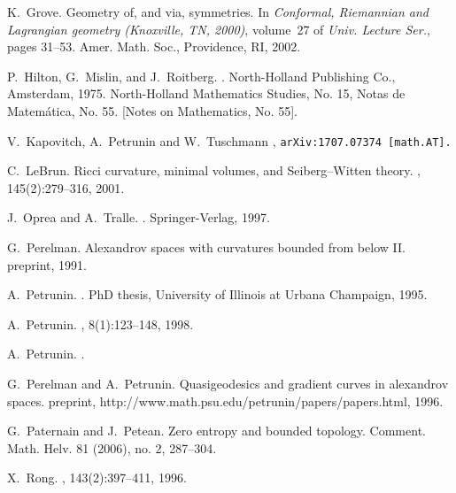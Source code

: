 \documentclass{amsart}
\begin{document}
\begin{thebibliography}{HMR75}
K.~Grove.
\newblock Geometry of, and via, symmetries.
\newblock In {\em Conformal, Riemannian and Lagrangian geometry (Knoxville, TN,
  2000)}, volume~27 of {\em Univ. Lecture Ser.}, pages 31--53. Amer. Math.
  Soc., Providence, RI, 2002.


P.~Hilton, G.~Mislin, and J.~Roitberg.
.
\newblock North-Holland Publishing Co., Amsterdam, 1975.
\newblock North-Holland Mathematics Studies, No. 15, Notas de Matem\'atica, No.
  55. [Notes on Mathematics, No. 55].
  
 V.~Kapovitch, A.~Petrunin and W.~Tuschmann
,
\texttt{arXiv:1707.07374  [math.AT].} 


C.~LeBrun.
\newblock Ricci curvature, minimal volumes, and {S}eiberg--{W}itten theory.
, 145(2):279--316, 2001.

J.~Oprea and A.~Tralle.
.
\newblock Springer-Verlag, 1997.

G.~Perelman.
\newblock Alexandrov spaces with curvatures bounded from below \rm{II}.
\newblock preprint, 1991.

A.~Petrunin.
.
\newblock PhD thesis, University of Illinois at Urbana Champaign, 1995.

A.~Petrunin.
, 8(1):123--148, 1998.

A.~Petrunin.
.


G.~Perelman and A.~Petrunin.
\newblock Quasigeodesics and gradient curves in alexandrov spaces.
\newblock preprint, http://www.math.psu.edu/petrunin/papers/papers.html, 1996.

G.~Paternain and J.~Petean.
\newblock Zero entropy and bounded topology.
\newblock  Comment. Math. Helv.  81  (2006),  no. 2, 287--304.

X.~Rong.
, 143(2):397--411, 1996.


\end{thebibliography}
\end{document}
